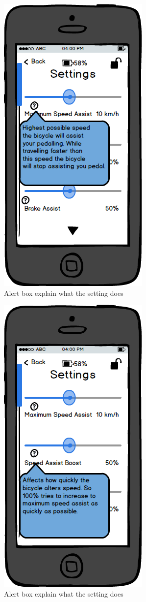 \documentclass[a4paper]{report}
\begin{document}
\clearpage
\begin{figure}
\centering
\includegraphics[scale=0.9]{figures/prototype_1/settings_help_1}
\caption{Alert box explain what the setting does}
\end{figure}
\clearpage
\begin{figure}
\centering
\includegraphics[scale=0.9]{figures/prototype_1/settings_help_2}
\caption{Alert box explain what the setting does}
\end{figure}
\end{document}
